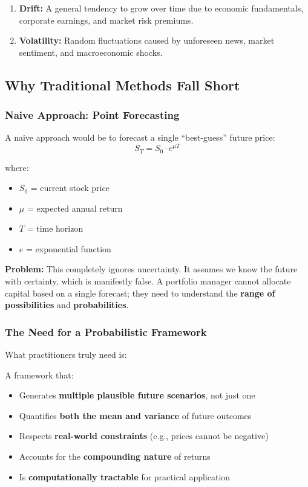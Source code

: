 \documentclass[12pt,a4paper]{article}
\begin{document}
\begin{enumerate}
    \item \textbf{Drift:} A general tendency to grow over time due to economic fundamentals, corporate earnings, and market risk premiums.
    \item \textbf{Volatility:} Random fluctuations caused by unforeseen news, market sentiment, and macroeconomic shocks.
\end{enumerate}

\subsection{Why Traditional Methods Fall Short}

\subsubsection{Naive Approach: Point Forecasting}

A naive approach would be to forecast a single ``best-guess'' future price:
\begin{equation}
S_T = S_0 \cdot e^{\mu T}
\end{equation}

where:
\begin{itemize}
    \item $S_0$ = current stock price
    \item $\mu$ = expected annual return
    \item $T$ = time horizon
    \item $e$ = exponential function
\end{itemize}

\textbf{Problem:} This completely ignores uncertainty. It assumes we know the future with certainty, which is manifestly false. A portfolio manager cannot allocate capital based on a single forecast; they need to understand the \textbf{range of possibilities} and \textbf{probabilities}.

\subsubsection{The Need for a Probabilistic Framework}

What practitioners truly need is:
\begin{tcolorbox}[colback=blue!5, colframe=blue!40, title=The Core Requirement]
A framework that:
\begin{itemize}
    \item Generates \textbf{multiple plausible future scenarios}, not just one
    \item Quantifies \textbf{both the mean and variance} of future outcomes
    \item Respects \textbf{real-world constraints} (e.g., prices cannot be negative)
    \item Accounts for the \textbf{compounding nature} of returns
    \item Is \textbf{computationally tractable} for practical application
\end{itemize}
\end{tcolorbox}
\end{document}
